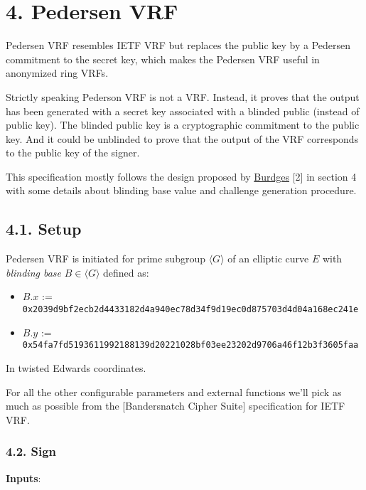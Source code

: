 \documentclass[
]{article}
\providecommand{\tightlist}{%
  \setlength{\itemsep}{0pt}\setlength{\parskip}{0pt}}
\begin{document}
\hypertarget{pedersen-vrf}{%
\section{4. Pedersen VRF}\label{pedersen-vrf}}

Pedersen VRF resembles IETF VRF but replaces the public key by a
Pedersen commitment to the secret key, which makes the Pedersen VRF
useful in anonymized ring VRFs.

Strictly speaking Pederson VRF is not a VRF. Instead, it proves that the
output has been generated with a secret key associated with a blinded
public (instead of public key). The blinded public key is a
cryptographic commitment to the public key. And it could be unblinded to
prove that the output of the VRF corresponds to the public key of the
signer.

This specification mostly follows the design proposed by
\href{https://eprint.iacr.org/2023/002}{Burdges} {[}2{]} in section 4
with some details about blinding base value and challenge generation
procedure.

\hypertarget{setup-1}{%
\subsection{4.1. Setup}\label{setup-1}}

Pedersen VRF is initiated for prime subgroup \(\langle G \rangle\) of an
elliptic curve \(E\) with \emph{blinding base}
\(B \in \langle G \rangle\) defined as:

\begin{itemize}
\tightlist
\item
  \(B.x\) :=
  \texttt{0x2039d9bf2ecb2d4433182d4a940ec78d34f9d19ec0d875703d4d04a168ec241e}
\item
  \(B.y\) :=
  \texttt{0x54fa7fd5193611992188139d20221028bf03ee23202d9706a46f12b3f3605faa}
\end{itemize}

In twisted Edwards coordinates.

For all the other configurable parameters and external functions we'll
pick as much as possible from the {[}Bandersnatch Cipher Suite{]}
specification for IETF VRF.

\hypertarget{sign-1}{%
\subsubsection{4.2. Sign}\label{sign-1}}

\textbf{Inputs}:
\end{document}

